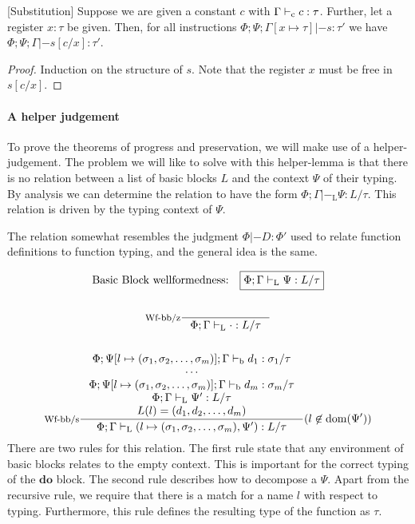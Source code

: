 \documentclass[a4paper, oneside, 10pt, draft]{memoir}
\begin{document}
\begin{lem}{[Substitution]}
  \label{lem:substitution}
  Suppose we are given a constant $c$ with $\Gamma |-_{\mathrm{c}} c :
  \tau$. Further, let a register $x : \tau$ be given. Then, for all
  instructions $\Phi;\Psi;\Gamma[x \mapsto \tau] |- s : \tau'$ we have
  $\Phi;\Psi;\Gamma |- s[c/x] : \tau'$.
\end{lem}
\begin{proof}
  Induction on the structure of $s$. Note that the register $x$ must
  be free in $s[c/x]$.
\end{proof}

\paragraph{A helper judgement}

\newcommand{\tpbb}{|-_{\mathrm{L}}}
To prove the theorems of progress and preservation, we will make use
of a helper-judgement. The problem we will like to solve with this
helper-lemma is that there is no relation between a list of basic
blocks $L$ and the context $\Psi$ of their typing. By analysis we can
determine the relation to have the form $\boxed{\Phi;\Gamma \tpbb \Psi :
  L / \tau}$. This relation is driven by the typing context of $\Psi$.

The relation somewhat resembles the judgment $\Phi |- D : \Phi'$ used
to relate function definitions to function typing, and the general
idea is the same.

\begin{gather*}
  \text{Basic Block wellformedness:} \quad \boxed{\Phi;\Gamma \tpbb
    \Psi : L / \tau}\\\\
  \inference[Wf-bb/z]{}{\Phi;\Gamma \tpbb \cdot : L / \tau}\\\\
  \inference[Wf-bb/s]{\Phi;\Psi[l\mapsto \sbundle];\Gamma \tpb d_1 :  \sigma_1 / \tau\\
  \dotsb\\
  \Phi;\Psi[l\mapsto \sbundle];\Gamma \tpb d_m : \sigma_m / \tau\\
  \Phi;\Gamma \tpbb \Psi' : L / \tau\\
  L(l) = \dbundle}
  {\Phi;\Gamma \tpbb (l \mapsto \sbundle, \Psi') : L / \tau}(l \not \in \dom{\Psi'})
\end{gather*}
There are two rules for this relation. The first rule state that any
environment of basic blocks relates to the empty context. This is
important for the correct typing of the $\mathbf{do}$ block. The
second rule describes how to decompose a $\Psi$. Apart from the
recursive rule, we require that there is a match for a name $l$ with
respect to typing. Furthermore, this rule defines the resulting type
of the function as $\tau$.
\end{document}
